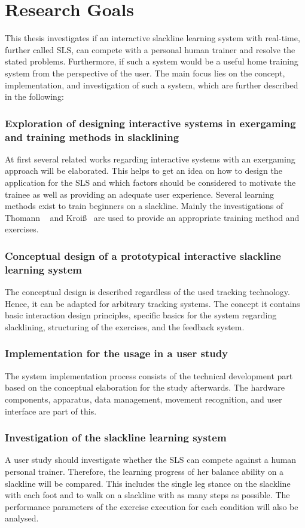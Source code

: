 \section{Research Goals}
This thesis investigates if an interactive slackline learning system with real-time, further called SLS, can compete with a personal human trainer and resolve the stated problems. 
Furthermore, if such a system would be a useful home training system from the perspective of the user.
The main focus lies on the concept, implementation, and investigation of such a system, which are further described in the following:

\subsubsection{Exploration of designing interactive systems in exergaming and training methods in slacklining}
At first several related works regarding interactive systems with an exergaming approach will be elaborated. 
This helps to get an idea on how to design the application for the SLS and which factors should be considered to motivate the trainee as well as providing an adequate user experience.
Several learning methods exist to train beginners on a slackline.
Mainly the investigations of Thomann ~\cite{Thomann2013-aa} and Kroiß~\cite{Kroiss2007-ab} are used to provide an appropriate training method and exercises. 

\subsubsection{Conceptual design of a prototypical interactive slackline learning system}
The conceptual design is described regardless of the used tracking technology.
Hence, it can be adapted for arbitrary tracking systems.
The concept it contains basic interaction design principles, specific basics for the system regarding slacklining, structuring of the exercises, and the feedback system.

\subsubsection{Implementation for the usage in a user study}
The system implementation process consists of the technical development part based on the conceptual elaboration for the study afterwards. 
The hardware components, apparatus, data management, movement recognition, and user interface are part of this.

\subsubsection{Investigation of the slackline learning system}
A user study should investigate whether the SLS can compete against a human personal trainer.
Therefore, the learning progress of her balance ability on a slackline will be compared.
This includes the single leg stance on the slackline with each foot and to walk on a slackline with as many steps as possible.
The performance parameters of the exercise execution for each condition will also be analysed.

